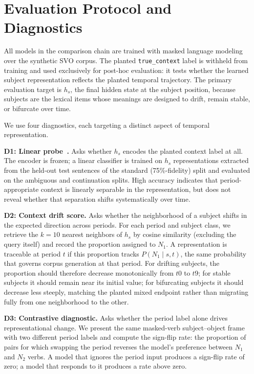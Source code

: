 \documentclass[runningheads]{llncs}
\begin{document}
\section{Evaluation Protocol and Diagnostics}
All models in the comparison chain are trained with masked language modeling
over the synthetic SVO corpus. The planted \texttt{true\_context} label is
withheld from training and used exclusively for post-hoc evaluation: it tests
whether the learned subject representation reflects the planted temporal
trajectory. The primary evaluation target is \(h_s\), the final hidden state
at the subject position, because subjects are the lexical items whose meanings
are designed to drift, remain stable, or bifurcate over time.

We use four diagnostics, each targeting a distinct aspect of temporal
representation.

\textbf{D1: Linear probe~\cite{conneau2018probing}.} Asks whether \(h_s\)
encodes the planted context label at all. The encoder is frozen; a linear
classifier is trained on \(h_s\) representations extracted from the held-out
test sentences of the standard (75\%-fidelity) split and evaluated on the
ambiguous and continuation splits. High accuracy indicates that
period-appropriate context is linearly separable in the representation, but
does not reveal whether that separation shifts systematically over time.

\textbf{D2: Context drift score.} Asks whether the neighborhood of a subject
shifts in the expected direction across periods. For each period and subject
class, we retrieve the \(k=10\) nearest neighbors of \(h_s\) by cosine
similarity (excluding the query itself) and record the proportion assigned to
$N_1$. A representation is traceable at period \(t\) if this proportion tracks
\(P(N_1 \mid s, t)\), the same probability that governs corpus generation at
that period. For drifting subjects, the proportion should therefore decrease
monotonically from $t0$ to $t9$; for stable subjects it should remain near its
initial value; for bifurcating subjects it should decrease less steeply, matching
the planted mixed endpoint rather than migrating fully from one neighborhood to
the other.

\textbf{D3: Contrastive diagnostic.} Asks whether the period label alone
drives representational change. We present the same masked-verb subject--object
frame with two different period labels and compute the sign-flip rate: the
proportion of pairs for which swapping the period reverses the model's preference
between $N_1$ and $N_2$ verbs. A model that ignores the period
input produces a sign-flip rate of zero; a model that responds to it produces a
rate above zero.
\end{document}
